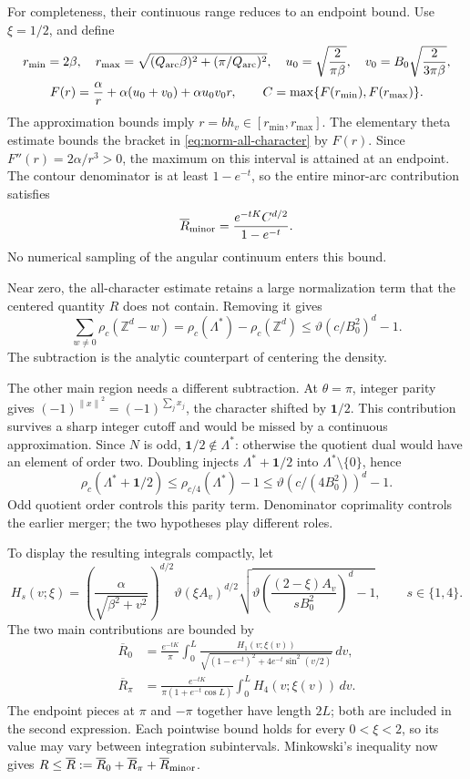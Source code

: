 \documentclass[11pt,a4paper]{article}
\newcommand{\Z}{\mathbb Z}
\newcommand{\norm}[1]{\left\lVert#1\right\rVert}
\theoremstyle{definition}
\theoremstyle{remark}
\numberwithin{equation}{section}
\begin{document}
For completeness, their continuous range reduces to an endpoint bound.
Use $\xi=1/2$, and define
\begin{gather*}
 r_{\min}=2\beta,\quad
 r_{\max}=\sqrt{(Q_{\rm arc}\beta)^2+(\pi/Q_{\rm arc})^2},\quad
 u_0=\sqrt{\frac2{\pi\beta}},\quad
 v_0=B_0\sqrt{\frac2{3\pi\beta}},\\
 F(r)=\frac\alpha r+\alpha(u_0+v_0)+\alpha u_0v_0r,
 \qquad C=\max\{F(r_{\min}),F(r_{\max})\}.
\end{gather*}
The approximation bounds imply $r=bh_v\in[r_{\min},r_{\max}]$.
The elementary theta estimate bounds the bracket in
\eqref{eq:norm-all-character} by $F(r)$. Since
$F''(r)=2\alpha/r^3>0$, the maximum on this interval is attained at an
endpoint. The contour denominator is at least $1-e^{-t}$, so the entire
minor-arc contribution satisfies
\[
 \overline R_{\rm minor}
 =\frac{e^{-tK}C^{d/2}}{1-e^{-t}}.
\]
No numerical sampling of the angular continuum enters this bound.

Near zero, the all-character estimate retains a large normalization
term that the centered quantity $R$ does not contain. Removing it gives
\[
 \sum_{w\ne0}\rho_c(\Z^d-w)
 =\rho_c(\Lambda^*)-\rho_c(\Z^d)
 \le\vartheta(c/B_0^2)^d-1.
\]
The subtraction is the analytic counterpart of centering the density.

The other main region needs a different subtraction. At $\theta=\pi$,
integer parity gives
$(-1)^{\norm x^2}=(-1)^{\sum_jx_j}$, the character shifted by
$\mathbf1/2$. This contribution survives a sharp integer cutoff and
would be missed by a continuous approximation. Since $N$ is odd,
$\mathbf1/2\notin\Lambda^*$: otherwise the quotient dual would have
an element of order two. Doubling injects
$\Lambda^*+\mathbf1/2$ into $\Lambda^*\setminus\{0\}$, hence
\[
 \rho_c(\Lambda^*+\mathbf1/2)
 \le\rho_{c/4}(\Lambda^*)-1
 \le\vartheta(c/(4B_0^2))^d-1.
\]
Odd quotient order controls this parity term. Denominator coprimality
controls the earlier merger; the two hypotheses play different roles.

To display the resulting integrals compactly, let
\[
 H_s(v;\xi)=
 \left(\frac\alpha{\sqrt{\beta^2+v^2}}\right)^{d/2}
 \vartheta(\xi A_v)^{d/2}
 \sqrt{\vartheta\!\left(\frac{(2-\xi)A_v}{sB_0^2}\right)^d-1},
 \qquad s\in\{1,4\}.
\]
The two main contributions are bounded by
\begin{align}
 \overline R_0&=\frac{e^{-tK}}\pi\int_0^L
 \frac{H_1(v;\xi(v))}
 {\sqrt{(1-e^{-t})^2+4e^{-t}\sin^2(v/2)}}\,dv,
 \label{eq:norm-zero-integral}\\
 \overline R_\pi&=\frac{e^{-tK}}{\pi(1+e^{-t}\cos L)}
 \int_0^L H_4(v;\xi(v))\,dv.
 \label{eq:norm-parity-integral}
\end{align}
The endpoint pieces at $\pi$ and $-\pi$ together have length $2L$;
both are included in the second expression. Each pointwise bound holds
for every $0<\xi<2$, so its value may vary between integration
subintervals. Minkowski's inequality now gives
$R\le\overline R:=\overline R_0+\overline R_\pi+\overline R_{\rm minor}$.
\end{document}
